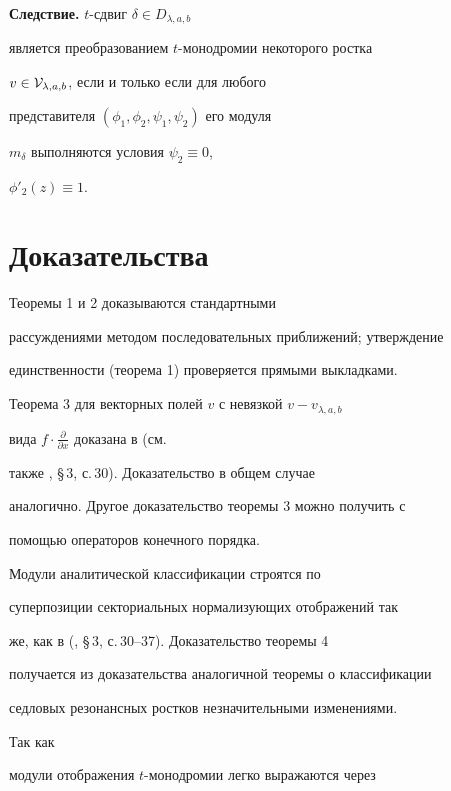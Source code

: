{\bf Следствие.} $t$-сдвиг $\delta\in D_{\lambda,a,b}$


является преобразованием $t$-монодромии некоторого ростка


$v\in{\cal V}_{\lambda,a,b}$, если и только если для любого


представителя $(\phi_1,\phi_2,\psi_1,\psi_2)$ его модуля


$m_\delta$ выполняются условия $\psi_2\equiv 0$,


$\phi'_2(z)\equiv 1$.





\section{Доказательства}





Теоремы 1 и 2 доказываются стандартными


рассуждениями методом последовательных приближений; утверждение


единственности (теорема 1) проверяется прямыми выкладками.





Теорема 3 для векторных полей $v$ с невязкой $v-v_{\lambda,a,b}$


вида $f\cdot \frac{\partial}{\partial x}$ доказана в \cite{1} (см.


также \cite{2}, \S\,3, с.\,30). Доказательство в общем случае


аналогично. Другое доказательство теоремы 3 можно получить с


помощью операторов конечного порядка.





Модули аналитической классификации строятся по


суперпозиции секториальных нормализующих отображений так


же, как в (\cite{2}, \S\,3, с.\,30--37). Доказательство теоремы 4


получается из доказательства аналогичной теоремы о классификации


седловых резонансных ростков незначительными изменениями.





Так как


модули отображения $t$-монодромии легко выражаются через


